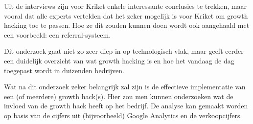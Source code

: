 Uit de interviews zijn voor Kriket enkele interessante conclusies te trekken, maar vooral dat alle experts vertelden dat het zeker mogelijk is voor Kriket om growth hacking toe te passen. Hoe ze dit zouden kunnen doen wordt ook aangehaald met een voorbeeld: een referral-systeem. 

Dit onderzoek gaat niet zo zeer diep in op technologisch vlak, maar geeft eerder een duidelijk overzicht van wat growth hacking is en hoe het vandaag de dag toegepast wordt in duizenden bedrijven.  

Wat na dit onderzoek zeker belangrijk zal zijn is de effectieve implementatie van een (of meerdere) growth hack(s). Hier zou men kunnen onderzoeken wat de invloed van de growth hack heeft op het bedrijf. De analyse kan gemaakt worden op basis van de cijfers uit (bijvoorbeeld) Google Analytics en de verkoopcijfers.